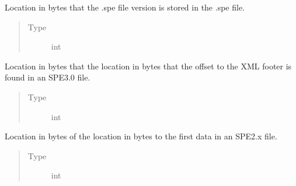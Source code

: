 \documentclass[a4paper,10pt,english]{sphinxmanual}
\begin{document}
\begin{fulllineitems}
\begin{fulllineitems}
\begin{quote}
\begin{description}
\end{description}\end{quote}

\end{fulllineitems}


\begin{fulllineitems}
\label{\detokenize{sfgtools:sfgtools.SFGProcessTools.spe_version_loc}}
\sphinxAtStartPar
Location in bytes that the .spe file version is stored in the .spe file.
\begin{quote}\begin{description}
\item[{Type}] \leavevmode
\sphinxAtStartPar
int

\end{description}\end{quote}

\end{fulllineitems}


\begin{fulllineitems}
\label{\detokenize{sfgtools:sfgtools.SFGProcessTools.footer_offset_loc_loc}}
\sphinxAtStartPar
Location in bytes that the location in bytes that the offset to the XML footer is found in an
SPE3.0 file.
\begin{quote}\begin{description}
\item[{Type}] \leavevmode
\sphinxAtStartPar
int

\end{description}\end{quote}

\end{fulllineitems}


\begin{fulllineitems}
\label{\detokenize{sfgtools:sfgtools.SFGProcessTools.data_offset_loc_loc}}
\sphinxAtStartPar
Location in bytes of the location in bytes to the first data in an SPE2.x file.
\begin{quote}\begin{description}
\item[{Type}] \leavevmode
\sphinxAtStartPar
int


\end{description}
\end{quote}
\end{fulllineitems}
\end{fulllineitems}
\end{document}
